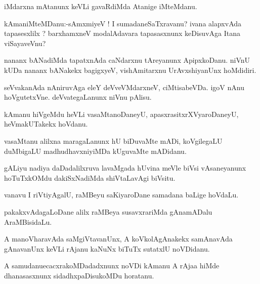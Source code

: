 \documentclass{article}
\begin{document}
\begin{mn}%
iMdarxna mAtanunx keVLi gavaRdiMda Atanige iMteMdanu.
\end{mn}

\begin{mn}%
kAmaniMteMDanu:-sAmxmiyeV ! I sumadaneSaTxravanu? ivana alapxvAda tapasesxlilx ? barxhamxneV
modalAdavara tapasasxnunx keDisuvAga Itana viSayaveVnu?
\end{mn}

\begin{mn}%
nananx bANadiMda tapatxnAda caNdarxnu tAreyanunx ApipxkoDanu. niVnU kUDa nananx bANakekx 
bagigxyeV, vishAmitarxnu UrAvxshiyanUnx hoMdidiri.
\end{mn}

\begin{mn}%
seVvakanAda nAniruvAga eleY deVveVMdarxneV, ciMtisabeVDa. igoV nAnu hoVgutetxVne. 
deVvategaLanunx niVnu pAlisu.
\end{mn}

\begin{mn}%
kAmanu hiVgeMdu heVLi vasaMtanoDaneyU, apasxrasitxrXVyaroDaneyU, heVmakUTakekx hoVdanu.
\end{mn}

\begin{mn}%
vasaMtanu alilxna maragaLanunx hU biDuvaMte mADi, koVgilegaLU duMbigaLU madhudhavxniyiMDa 
kUguvaMte mADidanu.
\end{mn}

\begin{mn}%
gALiyu nadiya daDadalilxruva lavaMgada hUvina meVle biVsi vAsaneyanunx hoTuTxkOMdu 
dakiSxNadiMda shiVtaLavAgi biVsitu.
\end{mn}

\begin{mn}%
vanavu I riVtiyAgalU, raMBeyu saKiyaroDane samadana baLige hoVdaLu.
\end{mn}

\begin{mn}%
pakakxvAdagaLoDane alilx raMBeya susavxrariMda gAnamADalu AraMBisidaLu.
\end{mn}

\begin{mn}%
A manoVharavAda saMgiVtavanUnx, A koVkolAgAnakekx samAnavAda gAnavanUnx keVLi rAjanu 
kaNuNx biTuTx sutatxlU noVDidanu.
\end{mn}

\begin{mn}%
A samudanuecacxrakoMDadadxnunx noVDi kAmanu A rAjaa hiMde dhanasasxnunx sidadhxpaDisukoMDu 
horatanu.
\end{mn}
\end{document}

